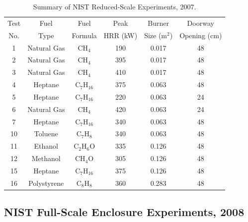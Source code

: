 \begin{table}[!ht]
\caption{Summary of NIST Reduced-Scale Experiments, 2007.}
\begin{center}
\begin{tabular}{|c|c|c|c|c|c|}
\hline
Test   &  Fuel         &  Fuel           & Peak        &  Burner       &  Doorway          \\
No.    &  Type         &  Formula        & HRR (kW)    &  Size (m$^2$) &  Opening (cm)     \\ \hline \hline
1      &  Natural Gas  &  CH$_4$         & 190         &  0.017        &  48               \\ \hline
2      &  Natural Gas  &  CH$_4$         & 395         &  0.017        &  48               \\ \hline
3      &  Natural Gas  &  CH$_4$         & 410         &  0.017        &  48               \\ \hline
4      &  Heptane      &  C$_7$H$_{16}$  & 375         &  0.063        &  48               \\ \hline
5      &  Heptane      &  C$_7$H$_{16}$  & 220         &  0.063        &  24               \\ \hline
6      &  Natural Gas  &  CH$_4$         & 420         &  0.063        &  24               \\ \hline
7      &  Heptane      &  C$_7$H$_{16}$  & 340         &  0.063        &  48               \\ \hline
10     &  Toluene      &  C$_7$H$_8$     & 340         &  0.063        &  48               \\ \hline
11     &  Ethanol      &  C$_2$H$_6$O    & 335         &  0.126        &  48               \\ \hline
12     &  Methanol     &  CH$_4$O        & 305         &  0.126        &  48               \\ \hline
15     &  Heptane      &  C$_7$H$_{16}$  & 375         &  0.126        &  48               \\ \hline
16     &  Polystyrene  &  C$_8$H$_8$     & 360         &  0.283        &  48               \\ \hline
\end{tabular}
\end{center}
\label{tab:NIST_RSE_Exp}
\end{table}


\subsection{NIST Full-Scale Enclosure Experiments, 2008}
\label{NIST_FSE_2008_Description}


